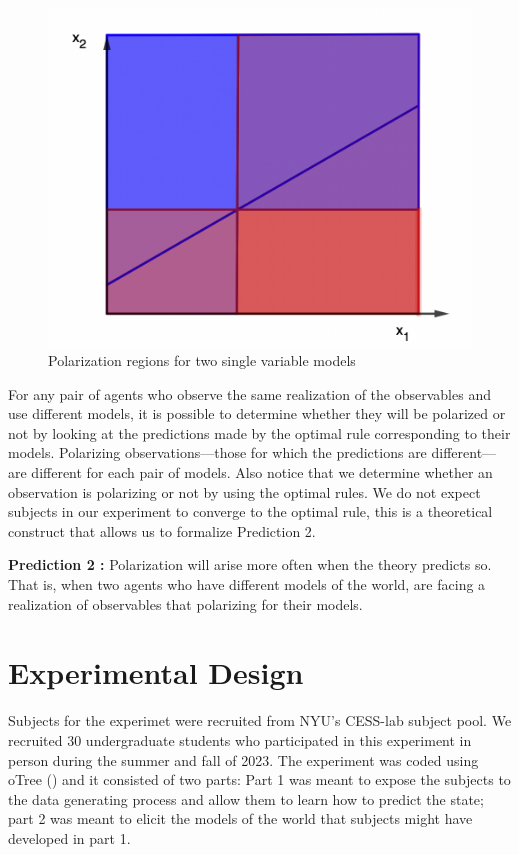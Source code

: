 \documentclass[
  12pt,
]{article}
\begin{document}
\begin{figure}

{\centering \includegraphics[width=0.65\linewidth]{../diagram_polariazation_2variables} 

}

\caption{\label{examp} Polarization regions for two single variable models}\label{fig:unnamed-chunk-1}
\end{figure}

For any pair of agents who observe the same realization of the
observables and use different models, it is possible to determine
whether they will be polarized or not by looking at the predictions made
by the optimal rule corresponding to their models. Polarizing
observations---those for which the predictions are different---are
different for each pair of models. Also notice that we determine whether
an observation is polarizing or not by using the optimal rules. We do
not expect subjects in our experiment to converge to the optimal rule,
this is a theoretical construct that allows us to formalize Prediction
2.

\textbf{Prediction 2 :} Polarization will arise more often when the
theory predicts so. That is, when two agents who have different models
of the world, are facing a realization of observables that polarizing
for their models.

\hypertarget{experimental-design}{%
\section{Experimental Design}\label{experimental-design}}

Subjects for the experimet were recruited from NYU's CESS-lab subject
pool. We recruited 30 undergraduate students who participated in this
experiment in person during the summer and fall of 2023. The experiment
was coded using oTree (\citet{otree}) and it consisted of two parts:
Part 1 was meant to expose the subjects to the data generating process
and allow them to learn how to predict the state; part 2 was meant to
elicit the models of the world that subjects might have developed in
part 1.
\end{document}
